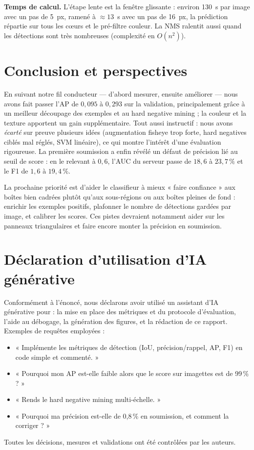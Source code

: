 \documentclass[a4paper,10pt]{article}
\begin{document}
\textbf{Temps de calcul.} L'étape lente est la fenêtre glissante : environ 130~s par
image avec un pas de 5~px, ramené à $\approx 13$~s avec un pas de 16~px, la prédiction
répartie sur tous les cœurs et le pré-filtre couleur. La NMS ralentit aussi quand les
détections sont très nombreuses (complexité en $O(n^2)$).

\section{Conclusion et perspectives}
En suivant notre fil conducteur — d'abord mesurer, ensuite améliorer — nous avons fait
passer l'AP de $0{,}095$ à $0{,}293$ sur la validation, principalement grâce à un
meilleur découpage des exemples et au hard negative mining ; la couleur et la texture
apportent un gain supplémentaire. Tout aussi instructif : nous avons \emph{écarté} sur
preuve plusieurs idées (augmentation fisheye trop forte, hard negatives ciblés mal
réglés, SVM linéaire), ce qui montre l'intérêt d'une évaluation rigoureuse. La
première soumission a enfin révélé un défaut de précision lié au seuil de score :
en le relevant à $0{,}6$, l'AUC du serveur passe de $18{,}6$ à $23{,}7\,\%$ et le F1
de $1{,}6$ à $19{,}4\,\%$.

La prochaine priorité est d'aider le classifieur à mieux « faire confiance » aux
boîtes bien cadrées plutôt qu'aux sous-régions ou aux boîtes pleines de fond :
enrichir les exemples positifs, plafonner le nombre de détections gardées par image,
et calibrer les scores. Ces pistes devraient notamment aider sur les panneaux
triangulaires et faire encore monter la précision en soumission.

\section*{Déclaration d'utilisation d'IA générative}
Conformément à l'énoncé, nous déclarons avoir utilisé un assistant d'IA générative
pour : la mise en place des
métriques et du protocole d'évaluation, l'aide au débogage, la génération des figures,
et la rédaction de ce rapport. Exemples de requêtes employées :
\begin{itemize}[noitemsep,topsep=2pt]
\item « Implémente les métriques de détection (IoU, précision/rappel, AP, F1) en code
simple et commenté. »
\item « Pourquoi mon AP est-elle faible alors que le score sur imagettes est de 99\,\% ? »
\item « Rends le hard negative mining multi-échelle. »
\item « Pourquoi ma précision est-elle de 0{,}8\,\% en soumission, et comment la corriger ? »
\end{itemize}
Toutes les décisions, mesures et validations ont été contrôlées par les auteurs.
\end{document}
